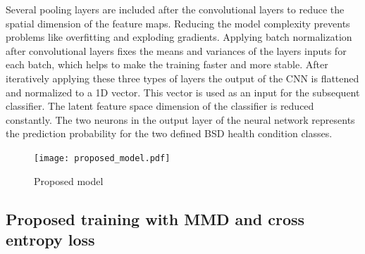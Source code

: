 Several pooling layers are included after the convolutional layers to reduce the spatial dimension of the feature maps. Reducing the model complexity prevents problems like overfitting and exploding gradients. Applying batch normalization after convolutional layers fixes the means and variances of the layers inputs for each batch, which helps to make the training faster and more stable. After iteratively applying these three types of layers the output of the CNN is flattened and normalized to a 1D vector. This vector is used as an input for the subsequent classifier. The latent feature space dimension of the classifier is reduced constantly. The two neurons in the output layer of the neural network represents the prediction probability for the two defined BSD health condition classes.


\begin{figure}[H]
  \centering
  \texttt{[image: proposed\_model.pdf]}
  \caption {Proposed model} \label{fig:proposed_model}
\end{figure}


\subsection{Proposed training with MMD and cross entropy loss} \label{sec:Proposed_training}


